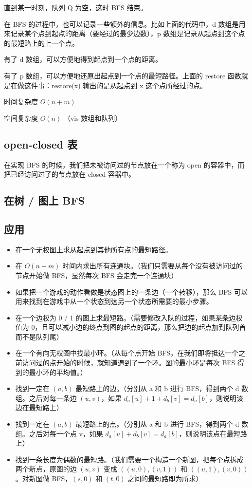 直到某一时刻，队列 Q 为空，这时 BFS 结束。

在 BFS 的过程中，也可以记录一些额外的信息。比如上面的代码中，d 数组是用来记录某个点到起点的距离（要经过的最少边数），p 数组是记录从起点到这个点的最短路上的上一个点。

有了 d 数组，可以方便地得到起点到一个点的距离。

有了 p 数组，可以方便地还原出起点到一个点的最短路径。上面的 restore 函数就是在做这件事：restore(x) 输出的是从起点到 x 这个点所经过的点。

时间复杂度 $O(n + m)$

空间复杂度 $O(n)$ （vis 数组和队列）

\subsection{open-closed 表}

在实现 BFS 的时候，我们把未被访问过的节点放在一个称为 open 的容器中，而把已经访问过了的节点放在 closed 容器中。

\subsection{ 在树 / 图上 BFS }

\subsection{应用}

\begin{itemize}
\item 在一个无权图上求从起点到其他所有点的最短路径。
\item 在 $O(n+m)$ 时间内求出所有连通块。（我们只需要从每个没有被访问过的节点开始做 BFS，显然每次 BFS 会走完一个连通块）
\item 如果把一个游戏的动作看做是状态图上的一条边（一个转移），那么 BFS 可以用来找到在游戏中从一个状态到达另一个状态所需要的最小步骤。
\item 在一个边权为 0 / 1 的图上求最短路。（需要修改入队的过程，如果某条边权值为 0，且可以减小边的终点到图的起点的距离，那么把边的起点加到队列首而不是队列尾）
\item 在一个有向无权图中找最小环。（从每个点开始 BFS，在我们即将抵达一个之前访问过的点开始的时候，就知道遇到了一个环。图的最小环是每次 BFS 得到的最小环的平均值。）
\item 找到一定在 $(a, b)$ 最短路上的边。（分别从 a 和 b 进行 BFS，得到两个 d 数组。之后对每一条边 $(u, v)$，如果 $d_a[u]+1+d_b[v]=d_a[b]$，则说明该边在最短路上）
\item 找到一定在 $(a, b)$ 最短路上的点。（分别从 a 和 b 进行 BFS，得到两个 d 数组。之后对每一个点 v，如果 $d_a[u]+d_b[v]=d_a[b]$，则说明该点在最短路上）
\item 找到一条长度为偶数的最短路。（我们需要一个构造一个新图，把每个点拆成两个新点，原图的边 $(u, v)$ 变成 $((u, 0), (v, 1))$ 和 $((u, 1), (v, 0))$。对新图做 BFS，$(s, 0)$ 和 $(t, 0)$ 之间的最短路即为所求）
\end{itemize}

